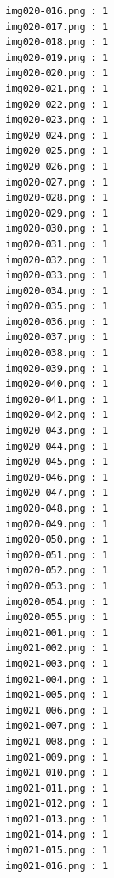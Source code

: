 \documentclass[12pt,a4paper]{article}
\begin{document}
\begin{lstlisting}
                     img020-016.png : 1
                     img020-017.png : 1
                     img020-018.png : 1
                     img020-019.png : 1
                     img020-020.png : 1
                     img020-021.png : 1
                     img020-022.png : 1
                     img020-023.png : 1
                     img020-024.png : 1
                     img020-025.png : 1
                     img020-026.png : 1
                     img020-027.png : 1
                     img020-028.png : 1
                     img020-029.png : 1
                     img020-030.png : 1
                     img020-031.png : 1
                     img020-032.png : 1
                     img020-033.png : 1
                     img020-034.png : 1
                     img020-035.png : 1
                     img020-036.png : 1
                     img020-037.png : 1
                     img020-038.png : 1
                     img020-039.png : 1
                     img020-040.png : 1
                     img020-041.png : 1
                     img020-042.png : 1
                     img020-043.png : 1
                     img020-044.png : 1
                     img020-045.png : 1
                     img020-046.png : 1
                     img020-047.png : 1
                     img020-048.png : 1
                     img020-049.png : 1
                     img020-050.png : 1
                     img020-051.png : 1
                     img020-052.png : 1
                     img020-053.png : 1
                     img020-054.png : 1
                     img020-055.png : 1
                     img021-001.png : 1
                     img021-002.png : 1
                     img021-003.png : 1
                     img021-004.png : 1
                     img021-005.png : 1
                     img021-006.png : 1
                     img021-007.png : 1
                     img021-008.png : 1
                     img021-009.png : 1
                     img021-010.png : 1
                     img021-011.png : 1
                     img021-012.png : 1
                     img021-013.png : 1
                     img021-014.png : 1
                     img021-015.png : 1
                     img021-016.png : 1




\end{lstlisting}
\end{document}
